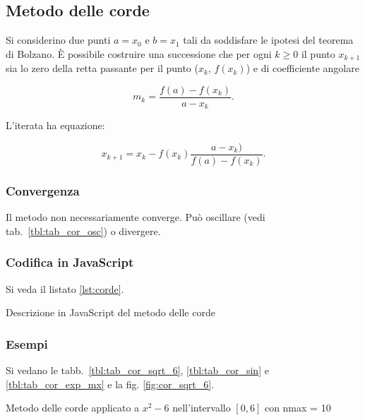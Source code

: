 \subsection{Metodo delle corde}

Si considerino due punti $a=x_0$ e $b=x_1$ tali da soddisfare le ipotesi del teorema di Bolzano.
È possibile costruire una successione che per ogni $k \geq 0$  il punto $x_{k+1}$ sia lo zero della retta passante per il punto
($x_{k}$, $f(x_{k})$) e di coefficiente angolare

$$\displaystyle m_k = \frac{f(a)  - f(x_k)}{a - x_k}.$$

L'iterata ha equazione:

$$x_{k+1} = x_k - f(x_k) \frac{a  - x_k)}{f(a) - f(x_k)}.$$

\subsubsection{Convergenza}

Il metodo non necessariamente converge.
Può oscillare (vedi tab.~\ref{tbl:tab_cor_osc}) o divergere.


\subsubsection{Codifica in JavaScript}

Si veda il listato \ref{lst:corde}.

\begin{lstfloat}
    
    \caption{Descrizione in JavaScript del metodo delle corde}
    \label{lst:corde}
\end{lstfloat}

\subsubsection{Esempi}

Si vedano le tabb.~\ref{tbl:tab_cor_sqrt_6}, \ref{tbl:tab_cor_sin} e \ref{tbl:tab_cor_exp_mx} e la fig. \ref{fig:cor_sqrt_6}.

\begin{table}
    \begin{center}
\end{center}        
\caption[]{Metodo delle corde applicato a $x^2 -6$ nell'intervallo $[0, 6]$ con nmax = 10}
\label{tbl:tab_cor_sqrt_6}
\end{table}


